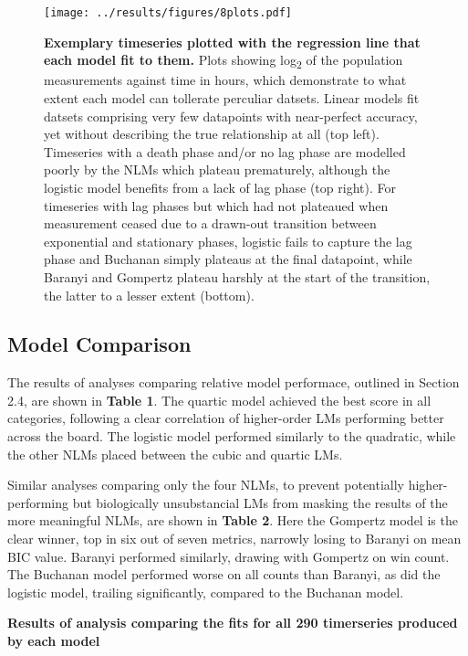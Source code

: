 \documentclass[11pt]{article}
\begin{document}
\begin{figure}[htb]
    \centering
    \texttt{[image: ../results/figures/8plots.pdf]} 
    \caption{\textbf{Exemplary timeseries plotted with the regression line that each model fit to them.}  Plots showing log\textsubscript{2} of the population measurements against time in hours, which demonstrate to what extent each model can tollerate perculiar datsets. Linear models fit datsets comprising very few datapoints with near-perfect accuracy, yet without describing the true relationship at all (top left). Timeseries with a death phase and/or no lag phase are modelled poorly by the NLMs which plateau prematurely, although the logistic model benefits from a lack of lag phase (top right). For timeseries with lag phases but which had not plateaued when measurement ceased due to a drawn-out transition between exponential and stationary phases, logistic fails to capture the lag phase and Buchanan simply plateaus at the final datapoint, while Baranyi and Gompertz plateau harshly at the start of the transition, the latter to a lesser extent (bottom).}
\end{figure}


\subsection{Model Comparison}

The results of analyses comparing relative model performace, outlined in Section 2.4, are shown in \textbf{Table 1}. The quartic model achieved the best score in all categories, following a clear correlation of higher-order LMs performing better across the board. The logistic model performed similarly to the quadratic, while the other NLMs placed between the cubic and quartic LMs. 

Similar analyses comparing only the four NLMs, to prevent potentially higher-performing but biologically unsubstancial LMs from masking the results of the more meaningful NLMs, are shown in \textbf{Table 2}. Here the Gompertz model is the clear winner, top in six out of seven metrics, narrowly losing to Baranyi on mean BIC value. Baranyi performed similarly, drawing with Gompertz on win count. The Buchanan model performed worse on all counts than Baranyi, as did the logistic model, trailing significantly, compared to the Buchanan model. 

\begin{table}[htb]
    \centering
    \caption{\textbf{Results of analysis comparing the fits for all 290 timerseries produced by each model}}
\end{table}
\end{document}
